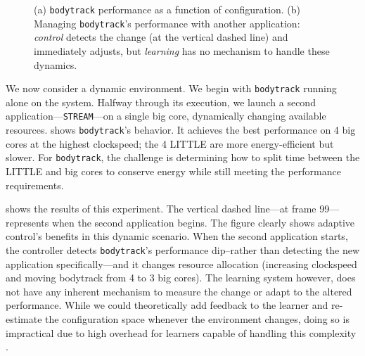 \begin{figure}
\centering
  \subfloat[]
  {
    
    \label{fig:BODYTRACK_timeline}    
  }
  \caption{(a) \texttt{bodytrack} performance as a function of
    configuration. (b) Managing \texttt{bodytrack}'s performance with
    another application: \emph{control} detects the change (at the
    vertical dashed line) and immediately adjusts, but \emph{learning}
    has no mechanism to handle these dynamics. }
  \label{fig:control}
\end{figure}


We now consider a dynamic environment.  We begin with
\texttt{bodytrack} running alone on the system.  Halfway through its
execution, we launch a second application---\texttt{STREAM}---on a
single big core, dynamically changing available resources.
 shows \texttt{bodytrack}'s behavior.
It achieves the best performance on 4 big cores at the highest
clockspeed; the 4 LITTLE are more energy-efficient but slower.  For
\texttt{bodytrack}, the challenge is determining how to split time
between the LITTLE and big cores to conserve energy while still
meeting the performance requirements.

 shows the results of this experiment.
The vertical dashed line---at frame 99---represents when the second
application begins.  The figure clearly shows adaptive control's
benefits in this dynamic scenario.  When the second application
starts, the controller detects \texttt{bodytrack}'s performance
dip--rather than detecting the new application specifically---and it
changes resource allocation (increasing clockspeed and moving
bodytrack from 4 to 3 big cores).  The learning system however, does
not have any inherent mechanism to measure the change or adapt to the
altered performance.  While we could theoretically add feedback to the
learner and re-estimate the configuration space whenever the
environment changes, doing so is impractical due to high overhead for
learners capable of handling this complexity
\cite{Paragon,quasar,LEO}.


